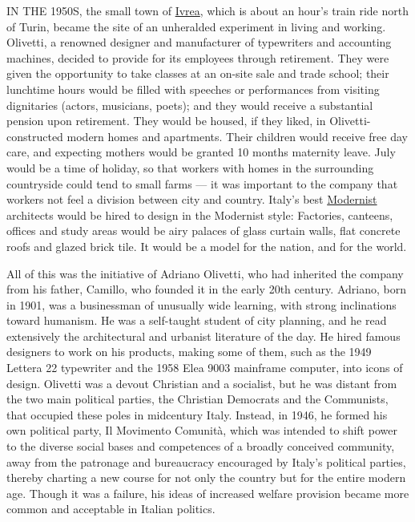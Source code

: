 IN THE 1950S, the small town of
\href{https://www.nytimes.com/2007/02/19/world/europe/19orange.html}{Ivrea},
which is about an hour's train ride north of Turin, became the site of
an unheralded experiment in living and working. Olivetti, a renowned
designer and manufacturer of typewriters and accounting machines,
decided to provide for its employees through retirement. They were given
the opportunity to take classes at an on-site sale and trade school;
their lunchtime hours would be filled with speeches or performances from
visiting dignitaries (actors, musicians, poets); and they would receive
a substantial pension upon retirement. They would be housed, if they
liked, in Olivetti-constructed modern homes and apartments. Their
children would receive free day care, and expecting mothers would be
granted 10 months maternity leave. July would be a time of holiday, so
that workers with homes in the surrounding countryside could tend to
small farms --- it was important to the company that workers not feel a
division between city and country. Italy's best
\href{https://www.nytimes.com/2019/08/08/t-magazine/osvaldo-borsani-home-varedo.html}{Modernist}
architects would be hired to design in the Modernist style: Factories,
canteens, offices and study areas would be airy palaces of glass curtain
walls, flat concrete roofs and glazed brick tile. It would be a model
for the nation, and for the world.

All of this was the initiative of Adriano Olivetti, who had inherited
the company from his father, Camillo, who founded it in the early 20th
century. Adriano, born in 1901, was a businessman of unusually wide
learning, with strong inclinations toward humanism. He was a self-taught
student of city planning, and he read extensively the architectural and
urbanist literature of the day. He hired famous designers to work on his
products, making some of them, such as the 1949 Lettera 22 typewriter
and the 1958 Elea 9003 mainframe computer, into icons of design.
Olivetti was a devout Christian and a socialist, but he was distant from
the two main political parties, the Christian Democrats and the
Communists, that occupied these poles in midcentury Italy. Instead, in
1946, he formed his own political party, Il Movimento Comunità, which
was intended to shift power to the diverse social bases and competences
of a broadly conceived community, away from the patronage and
bureaucracy encouraged by Italy's political parties, thereby charting a
new course for not only the country but for the entire modern age.
Though it was a failure, his ideas of increased welfare provision became
more common and acceptable in Italian politics.

